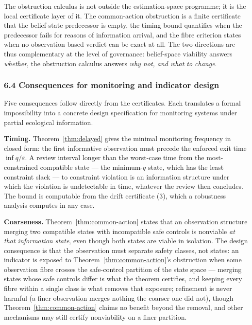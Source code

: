 \documentclass[11pt]{article}
\theoremstyle{definition}
\begin{document}
The obstruction calculus is not outside the estimation-space programme;
it is the local certificate layer of it. The common-action obstruction
is a finite certificate that the belief-state predecessor is empty, the
timing bound quantifies when the predecessor fails for reasons of
information arrival, and the fibre criterion states when no
observation-based verdict can be exact at all. The two directions are
thus complementary at the level of governance: belief-space viability
answers \emph{whether}, the obstruction calculus answers \emph{why not,
and what to change}.

\subsubsection{6.4 Consequences for monitoring and indicator
design}\label{consequences-for-monitoring-and-indicator-design}

Five consequences follow directly from the certificates. Each translates
a formal impossibility into a concrete design specification for
monitoring systems under partial ecological information.

\textbf{Timing.} Theorem~\ref{thm:delayed} gives the minimal monitoring frequency in
closed form: the first informative observation must precede the enforced
exit time \(\inf q / \varepsilon\). A review interval longer than the
worst-case time from the most-constrained compatible state --- the
minimum-\(q\) state, which has the least constraint slack --- to
constraint violation is an information structure under which the
violation is undetectable in time, whatever the review then concludes.
The bound is computable from the drift certificate (3), which a robustness analysis computes in any case.

\textbf{Coarseness.} Theorem~\ref{thm:common-action} states that an observation structure
merging two compatible states with incompatible safe controls is
nonviable \emph{at that information state}, even though both states are
viable in isolation. The design consequence is that the observation must
separate safety classes, not states: an indicator is exposed to Theorem~\ref{thm:common-action}'s obstruction when some observation fibre crosses the safe-control
partition of the state space --- merging states whose safe controls differ is what the theorem certifies, and keeping every fibre within a single class is what removes that exposure; refinement is never harmful (a finer observation merges nothing the coarser one did not), though Theorem~\ref{thm:common-action}
claims no benefit beyond the removal, and other mechanisms may still
certify nonviability on a finer partition.
\end{document}
